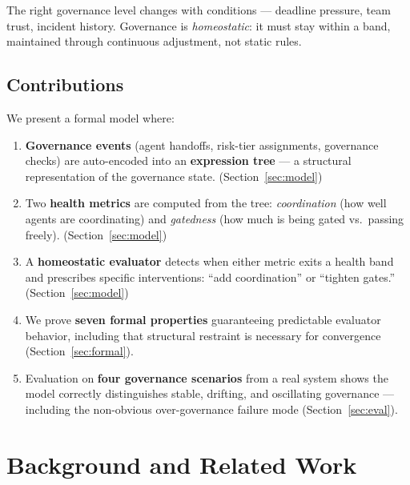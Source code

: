 \documentclass[sigconf,nonacm]{acmart}
\begin{document}
The right governance level changes with conditions --- deadline pressure,
team trust, incident history. Governance is \emph{homeostatic}: it must
stay within a band, maintained through continuous adjustment, not static
rules.

\subsection{Contributions}

We present a formal model where:

\begin{enumerate}[leftmargin=*]
  \item \textbf{Governance events} (agent handoffs, risk-tier assignments,
    governance checks) are auto-encoded into an \textbf{expression tree}
    --- a structural representation of the governance state.
    (Section~\ref{sec:model})

  \item Two \textbf{health metrics} are computed from the tree:
    \emph{coordination} (how well agents are coordinating) and
    \emph{gatedness} (how much is being gated vs.\ passing freely).
    (Section~\ref{sec:model})

  \item A \textbf{homeostatic evaluator} detects when either metric exits
    a health band and prescribes specific interventions: ``add
    coordination'' or ``tighten gates.'' (Section~\ref{sec:model})

  \item We prove \textbf{seven formal properties} guaranteeing predictable
    evaluator behavior, including that structural restraint is necessary
    for convergence (Section~\ref{sec:formal}).

  \item Evaluation on \textbf{four governance scenarios} from a real
    system shows the model correctly distinguishes stable, drifting, and
    oscillating governance --- including the non-obvious over-governance
    failure mode (Section~\ref{sec:eval}).
\end{enumerate}


\section{Background and Related Work}
\end{document}
